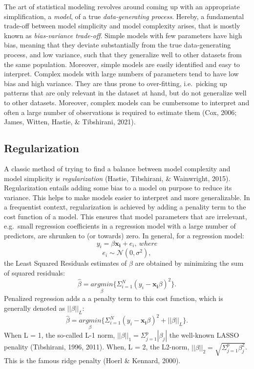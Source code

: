 \documentclass[
  man, donotrepeattitle,floatsintext]{apa6}
\begin{document}
The art of statistical modeling revolves around coming up with an appropriate simplification, a \emph{model}, of a true \emph{data-generating process}. Hereby, a fundamental trade-off between model simplicity and model complexity arises, that is mostly known as \emph{bias-variance trade-off}. Simple models with few parameters have high bias, meaning that they deviate substantially from the true data-generating process, and low variance, such that they generalize well to other datasets from the same population. Moreover, simple models are easily identified and easy to interpret. Complex models with large numbers of parameters tend to have low bias and high variance. They are thus prone to over-fitting, i.e.~picking up patterns that are only relevant in the dataset at hand, but do not generalize well to other datasets. Moreover, complex models can be cumbersome to interpret and often a large number of observations is required to estimate them (Cox, 2006; James, Witten, Hastie, \& Tibshirani, 2021).

\hypertarget{regularization}{%
\subsection{Regularization}\label{regularization}}

A classic method of trying to find a balance between model complexity and model simplicity is \emph{regularization} (Hastie, Tibshirani, \& Wainwright, 2015). Regularization entails adding some bias to a model on purpose to reduce its variance. This helps to make models easier to interpret and more generalizable. In a frequentist context, regularization is achieved by adding a penality term to the cost function of a model. This ensures that model parameters that are irrelevant, e.g.~small regression coefficients in a regression model with a large number of predictors, are shrunken to (or towards) zero. In general, for a regression model:
\[y_i = \beta \mathbf{x_i} + e_i, \ where \]
\[e_i \sim \mathcal{N}(0, \sigma^2), \]
the Least Squared Residuals estimates of \(\beta\) are obtained by minimizing the sum of squared residuals:
\[ \hat{\beta} = \underset{\beta}{argmin} \{ \Sigma_{i=1}^N(y_i - \mathbf{x_{i}} \beta)^2 \}.\] Penalized regression adds a a penalty term to this cost function, which is generally denoted as \(||\beta||_L\):
\[ \hat{\beta} = \underset{\beta}{argmin} \{ \Sigma_{i=1}^N(y_i - \mathbf{x_{i}} \beta )^2 + ||\beta||_{L} \}.\]
When L = 1, the so-called L-1 norm, \(||\beta||_1 = \Sigma_{j=1}^p |\beta_j|\) the well-known LASSO penality (Tibshirani, 1996, 2011). When, L = 2, the L2-norm, \(||\beta||_2 = \sqrt{\Sigma_{j=1}^p \beta_j^2}\). This is the famous ridge penalty (Hoerl \& Kennard, 2000).
\end{document}

